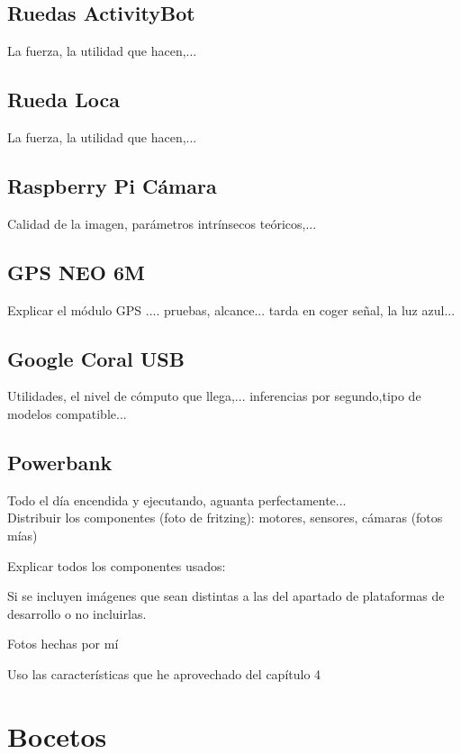 \subsection{Ruedas ActivityBot}
La fuerza, la utilidad que hacen,...

\subsection{Rueda Loca}
La fuerza, la utilidad que hacen,...

\subsection{Raspberry Pi Cámara}

Calidad de la imagen, parámetros intrínsecos teóricos,... 

\subsection{GPS NEO 6M}
Explicar el módulo GPS .... pruebas, alcance... tarda en coger señal, la luz azul...

\subsection{Google Coral USB}

Utilidades, el nivel de cómputo que llega,... inferencias por segundo,tipo de modelos compatible...

\subsection{Powerbank}
 
 Todo el día encendida y ejecutando, aguanta perfectamente... \\
 
  
  
 Distribuir los componentes (foto de fritzing): motores, sensores, cámaras (fotos mías)
 
 
 Explicar todos los componentes usados: 
 
 Si se incluyen imágenes que sean distintas a las del apartado de plataformas de desarrollo o no incluirlas. 
 
 Fotos hechas por mí 
 
 Uso las características que he aprovechado del capítulo 4 
 
 
\section{Bocetos}

